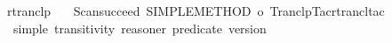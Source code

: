 \begin{isabellebody}
\ rtranclp\ {\isacharequal}{\kern0pt}\isanewline
\ \ {\isacartoucheopen}Scan{\isachardot}{\kern0pt}succeed\ {\isacharparenleft}{\kern0pt}SIMPLE{\isacharunderscore}{\kern0pt}METHOD{\isacharprime}{\kern0pt}\ o\ Tranclp{\isacharunderscore}{\kern0pt}Tac{\isachardot}{\kern0pt}rtrancl{\isacharunderscore}{\kern0pt}tac{\isacharparenright}{\kern0pt}{\isacartoucheclose}\isanewline
\ \ {\isacartoucheopen}simple\ transitivity\ reasoner\ {\isacharparenleft}{\kern0pt}predicate\ version{\isacharparenright}{\kern0pt}{\isacartoucheclose}%
\endisatagML
{\isafoldML}%
%
\isadelimML
%
\endisadelimML
\isanewline
%
\isadelimtheory
\isanewline
%
\endisadelimtheory
%
\isatagtheory
{}\isamarkupfalse%
%
\endisatagtheory
{\isafoldtheory}%
%
\isadelimtheory
%
\endisadelimtheory
%
\end{isabellebody}%
\endinput
